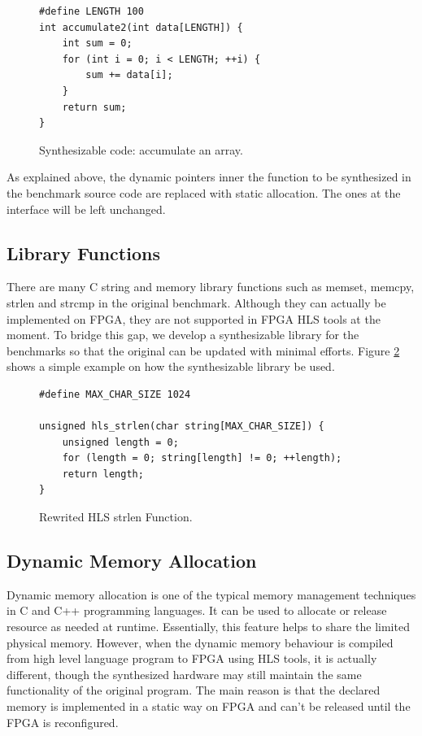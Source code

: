 \documentclass[conference]{IEEEtran}
\begin{document}
\begin{figure}[htb]\centering
{\fontsize{8}{8}\selectfont
\begin{lstlisting}[frame=lines]
#define LENGTH 100
int accumulate2(int data[LENGTH]) {
    int sum = 0;
    for (int i = 0; i < LENGTH; ++i) {
        sum += data[i];
    }
    return sum;
}
\end{lstlisting}
}
\caption{Synthesizable code: accumulate an array.}\label{Synthesizable-code}
\end{figure}

As explained above, the dynamic pointers inner the function to be synthesized in the benchmark source code are replaced with static allocation. The ones at the interface will be left unchanged.

\subsection{Library Functions}
There are many C string and memory library functions such as memset, memcpy, strlen and strcmp in the original benchmark. Although they can actually be implemented on FPGA, they are not supported in FPGA HLS tools at the moment. To bridge this gap, we develop a synthesizable library for the benchmarks so that the original can be updated with minimal efforts. Figure \ref{hls_strlen} shows a simple example on how the synthesizable library be used.

\begin{figure}[htb]\centering
{\fontsize{8}{8}\selectfont
\begin{lstlisting}[frame=lines]
#define MAX_CHAR_SIZE 1024

unsigned hls_strlen(char string[MAX_CHAR_SIZE]) {
    unsigned length = 0;
    for (length = 0; string[length] != 0; ++length);
    return length;
}
\end{lstlisting}
}
\caption{Rewrited HLS strlen Function.}\label{hls_strlen}
\end{figure}

\subsection{Dynamic Memory Allocation}\label{section_malloc}
Dynamic memory allocation is one of the typical memory management techniques in C and C++ programming languages. It can be used to allocate or release resource as needed at runtime. Essentially, this feature helps to share the limited physical memory. However, when the dynamic memory behaviour is compiled from high level language program to FPGA using HLS tools, it is actually different, though the synthesized hardware may still maintain the same functionality of the original program. The main reason is that the declared memory is implemented in a static way on FPGA and can't be released until the FPGA is reconfigured.
\end{document}
